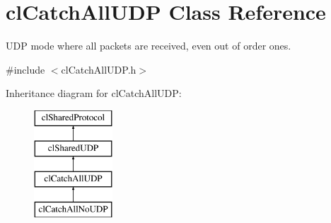 \hypertarget{classcl_catch_all_u_d_p}{
\section{clCatchAllUDP Class Reference}
\label{classcl_catch_all_u_d_p}
}


UDP mode where all packets are received, even out of order ones.  




{\ttfamily \#include $<$clCatchAllUDP.h$>$}

Inheritance diagram for clCatchAllUDP:\begin{figure}[H]
\begin{center}
\leavevmode
\includegraphics[height=4.000000cm]{classcl_catch_all_u_d_p}
\end{center}
\end{figure}
